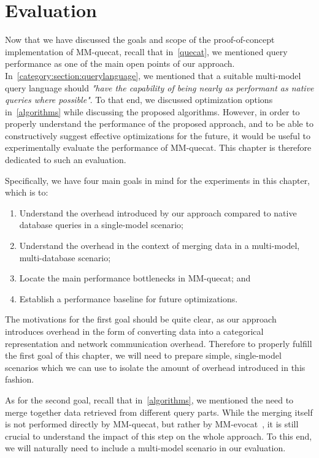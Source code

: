 \chapter{Evaluation}
\label{eval}

Now that we have discussed the goals and scope of the proof-of-concept implementation of MM-quecat, recall that in~\cref{quecat}, we mentioned query performance as one of the main open points of our approach.
In~\cref{category:section:querylanguage}, we mentioned that a suitable multi-model query language should \textit{"have the capability of being nearly as performant as native queries where possible"}.
To that end, we discussed optimization options in~\cref{algorithms} while discussing the proposed algorithms.
However, in order to properly understand the performance of the proposed approach, and to be able to constructively suggest effective optimizations for the future, it would be useful to experimentally evaluate the performance of MM-quecat.
This chapter is therefore dedicated to such an evaluation.

Specifically, we have four main goals in mind for the experiments in this chapter, which is to:

\begin{enumerate}
    \item Understand the overhead introduced by our approach compared to native database queries in a single-model scenario;
    \item Understand the overhead in the context of merging data in a multi-model, multi-database scenario;
    \item Locate the main performance bottlenecks in MM-quecat; and
    \item Establish a performance baseline for future optimizations.
\end{enumerate}

The motivations for the first goal should be quite clear, as our approach introduces overhead in the form of converting data into a categorical representation and network communication overhead.
Therefore to properly fulfill the first goal of this chapter, we will need to prepare simple, single-model scenarios which we can use to isolate the amount of overhead introduced in this fashion.

As for the second goal, recall that in~\cref{algorithms}, we mentioned the need to merge together data retrieved from different query parts.
While the merging itself is not performed directly by MM-quecat, but rather by MM-evocat~\cite{evocat}, it is still crucial to understand the impact of this step on the whole approach.
To this end, we will naturally need to include a multi-model scenario in our evaluation.

